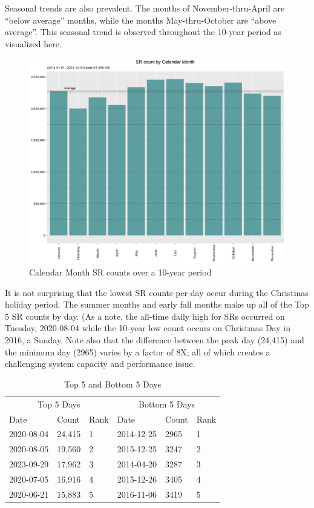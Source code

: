 \documentclass[12pt, titlepage]{article}
\begin{document}
Seasonal trends are also prevalent. The months of November-thru-April are ``below average'' months, while the months May-thru-October are ``above average''. 
This seasonal trend is observed throughout the 10-year period as visualized here.

\begin{figure}[H]
  \centering
  \includegraphics[width=\textwidth]{Calendar-Month.png}
  \caption{Calendar Month SR counts over a 10-year period}
  \label{fig:calendar-months-counts}
\end{figure}

It is not surprising that the lowest SR counts-per-day occur during the Christmas holiday period. The summer months and early
fall months make up all of the Top 5 SR counts by day. (As a note, the all-time daily high for SRs occurred on Tuesday, 2020-08-04 while the 10-year
low count occurs on Christmas Day in 2016, a Sunday. Note also that the difference between the peak day (24,415) and the minimum day (2965) varies
by a factor of 8X; all of which creates a challenging  system capacity and performance issue.

\begin{table}[H]
    \centering
    \small
    \begin{tabular}{@{}lll|lll@{}}
        \toprule
        \multicolumn{3}{c|}{Top 5 Days} & \multicolumn{3}{c}{Bottom 5 Days} \\
        \cmidrule(r){1-3} \cmidrule(l){4-6}
        Date & Count & Rank & Date & Count & Rank \\
        \midrule
        2020-08-04 & 24,415 & 1 & 2014-12-25 & 2965 & 1 \\
        2020-08-05 & 19,560 & 2 & 2015-12-25 & 3247 & 2 \\
        2023-09-29 & 17,962 & 3 & 2014-04-20 & 3287 & 3 \\
        2020-07-05 & 16,916 & 4 & 2015-12-26 & 3405 & 4 \\
        2020-06-21 & 15,883 & 5 & 2016-11-06 & 3419 & 5 \\
        \bottomrule
    \end{tabular}
    \caption{Top 5 and Bottom 5 Days}
    \label{tab:combined_counts}
\end{table}
\end{document}
